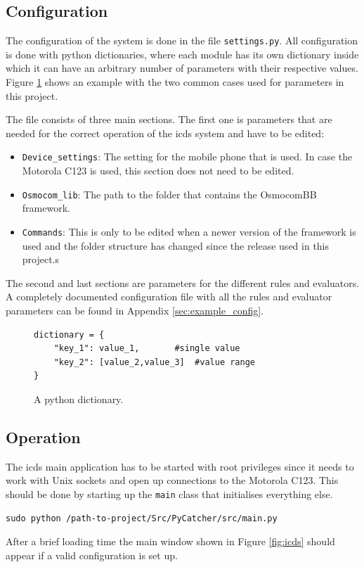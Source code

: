 \subsection{Configuration}
\label{sec:configuration}
The configuration of the system is done in the file \texttt{settings.py}.
All configuration is done with python dictionaries, where each module has its own dictionary inside which it can have an arbitrary number of parameters with their respective values.
Figure \ref{fig:python_dict} shows an example with the two common cases used for parameters in this project.

The file consists of three main sections.
The first one is parameters that are needed for the correct operation of the \gls{icds} system and have to be edited:
\begin{itemize}
	\item \texttt{Device\_settings}: The setting for the mobile phone that is used.
	In case the Motorola C123 is used, this section does not need to be edited.
	\item \texttt{Osmocom\_lib}: The path to the folder that contains the OsmocomBB framework.
	\item \texttt{Commands}: This is only to be edited when a newer version of the framework is used and the folder structure has changed since the release used in this project.s
\end{itemize}
The second and last sections are parameters for the different rules and evaluators.
A completely documented configuration file with all the rules and evaluator parameters can be found in Appendix \ref{sec:example_config}.
\begin{figure}
\begin{lstlisting}
dictionary = {
	"key_1": value_1,		#single value
	"key_2": [value_2,value_3]	#value range
}
\end{lstlisting}
\caption{A python dictionary.}
\label{fig:python_dict}
\end{figure}
\subsection{Operation}
\label{sec:icds_operation}
The \gls{icds} main application has to be started with root privileges since it needs to work with Unix sockets and open up connections to the Motorola C123.
This should be done by starting up the \texttt{main} class that initialises everything else.
\begin{lstlisting}
sudo python /path-to-project/Src/PyCatcher/src/main.py
\end{lstlisting}
After a brief loading time the main window shown in Figure \ref{fig:icds} should appear if a valid configuration is set up.

